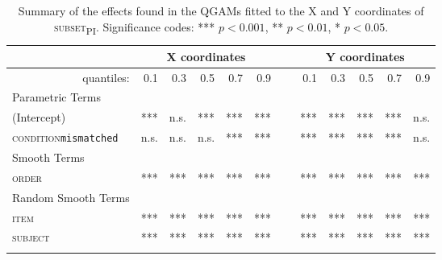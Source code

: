 \begin{table}\fontsize{9}{10}
\caption{Summary of the effects found in the QGAMs fitted to the X and Y coordinates of \textsc{subset\textsubscript{PI}}. Significance codes: *** $p < 0.001$, ** $p < 0.01$, * $p < 0.05$.}
\label{tab:8.8}
\centering
\begin{tabular}{lrrrrrrrrrrr}
\lsptoprule
~                   & \multicolumn{5}{c}{X coordinates}    & \multicolumn{1}{c}{}                          & \multicolumn{5}{c}{Y coordinates}                               \\
\midrule
\multicolumn{1}{r}{quantiles:}          & 0.1        & 0.3        & 0.5        & 0.7        & 0.9  & ~      & 0.1        & 0.3        & 0.5        & 0.7        & 0.9         \\
\midrule
Parametric Terms    & \textbf{~} & \textbf{~} & \textbf{~} & \textbf{~} & \textbf{~} & \textbf{~} & \textbf{~} & \textbf{~} & \textbf{~} & \textbf{~}  \\
\midrule
(Intercept)         & ***        & n.s.         & ***        & ***        & ***    & ~    & ***        & ***        & ***        & ***        & n.s.          \\
\textsc{condition}\texttt{mismatched} & n.s.       & n.s.          & n.s.        & ***        & *** & ~       & ***       & ***        & ***        & ***        & n.s.         \\
\midrule
Smooth Terms        & \textbf{~} & \textbf{~} & \textbf{~} & \textbf{~} & \textbf{~} & \textbf{~} & \textbf{~} & \textbf{~} & \textbf{~} & \textbf{~}  \\
\midrule
\textsc{order}               & ***        & ***        & ***        & ***        & ***  & ~      & ***        & ***        & ***        & ***        & ***         \\
\midrule
Random Smooth Terms & \textbf{~} & \textbf{~} & \textbf{~} & \textbf{~} & \textbf{~} & \textbf{~} & \textbf{~} & \textbf{~} & \textbf{~} & \textbf{~}  \\
\midrule
\textsc{item}                & ***        & ***        & ***        & ***        & ***  & ~      & ***        & ***        & ***        & ***        & ***         \\
\textsc{subject}             & ***        & ***        & ***        & ***        & ***  & ~      & ***        & ***        & ***        & ***        & ***        \\
\lspbottomrule
\end{tabular}
\end{table}

